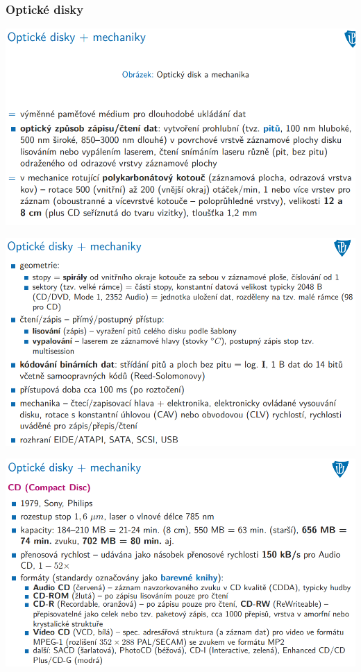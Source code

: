\documentclass[10pt,a4paper]{article}
\begin{document}
\subsubsection{Optické disky}
\includegraphics[scale=0.65]{img/prvni_odstavec/otazka7/opticke_disky1.png}

\includegraphics[scale=0.65]{img/prvni_odstavec/otazka7/opticke_disky2.png}

\includegraphics[scale=0.65]{img/prvni_odstavec/otazka7/opticke_disky3.png}
\end{document}
